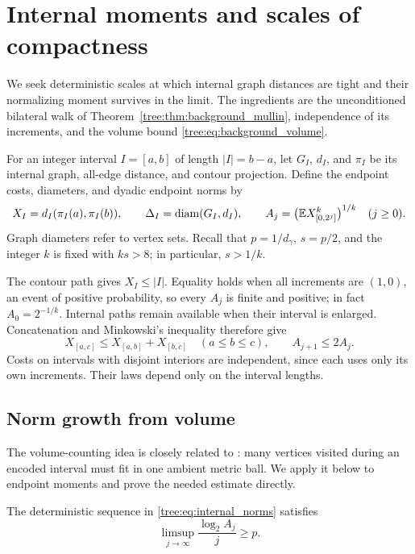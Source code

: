 \section{Internal moments and scales of compactness}
\label{tree:sec:moments}

We seek deterministic scales at which internal graph distances are tight
and their normalizing moment survives in the limit. The ingredients are
the unconditioned bilateral walk of
Theorem~\ref{tree:thm:background_mullin}, independence of its increments,
and the volume bound \eqref{tree:eq:background_volume}.

For an integer interval $I=[a,b]$ of length $|I|=b-a$, let $G_I$,
$d_I$, and $\pi_I$ be its internal graph, all-edge distance, and contour
projection. Define the endpoint costs, diameters, and dyadic endpoint norms by
\begin{equation}\label{tree:eq:internal_norms}
 X_I=d_I(\pi_I(a),\pi_I(b)),\qquad
 \Delta_I=\operatorname{diam}(G_I,d_I),\qquad
 A_j=\bigl(\mathbb E X_{[0,2^j]}^k\bigr)^{1/k}\quad(j\geq0).
\end{equation}
Graph diameters refer to vertex sets. Recall that $p=1/d_\gamma$,
$s=p/2$, and the integer $k$ is fixed with $ks>8$; in particular,
$s>1/k$.

The contour path gives $X_I\leq |I|$. Equality holds when all increments
are $(1,0)$, an event of positive probability, so every $A_j$ is finite
and positive; in fact $A_0=2^{-1/k}$. Internal paths remain available
when their interval is enlarged. Concatenation and Minkowski's inequality
therefore give
\begin{equation}\label{tree:eq:internal_subadditivity}
 X_{[a,c]}\leq X_{[a,b]}+X_{[b,c]}
 \quad(a\leq b\leq c),\qquad A_{j+1}\leq2A_j.
\end{equation}
Costs on intervals with disjoint interiors are independent, since each
uses only its own increments. Their laws depend only on the interval
lengths.

\subsection{Norm growth from volume}

The volume-counting idea is closely related to
\cite[Lemma~3.2]{GwynnePfefferDLA}: many vertices visited during an
encoded interval must fit in one ambient metric ball. We apply it below
to endpoint moments and prove the needed estimate directly.

\begin{lemma}\label{tree:lem:moment_growth}
The deterministic sequence in \eqref{tree:eq:internal_norms} satisfies
\begin{equation}\label{tree:eq:moment_limsup}
 \limsup_{j\to\infty}\frac{\log_2 A_j}{j}\geq p.
\end{equation}
\end{lemma}

